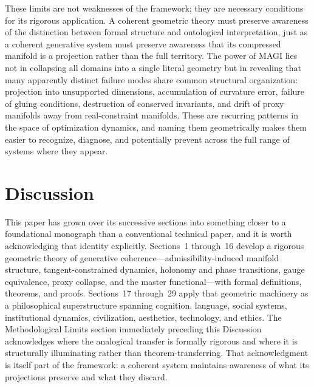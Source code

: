 \documentclass[11pt,a4paper,twocolumn]{article}
\begin{document}
These limits are not weaknesses of the framework; they are
necessary conditions for its rigorous application. A coherent
geometric theory must preserve awareness of the distinction between
formal structure and ontological interpretation, just as a
coherent generative system must preserve awareness that its
compressed manifold is a projection rather than the full territory.
The power of MAGI lies not in collapsing all domains into a single
literal geometry but in revealing that many apparently distinct
failure modes share common structural organization: projection into
unsupported dimensions, accumulation of curvature error, failure of
gluing conditions, destruction of conserved invariants, and
drift of proxy manifolds away from real-constraint manifolds. These
are recurring patterns in the space of optimization dynamics, and
naming them geometrically makes them easier to recognize, diagnose,
and potentially prevent across the full range of systems where they
appear.


\section{Discussion}

This paper has grown over its successive sections into something
closer to a foundational monograph than a conventional technical
paper, and it is worth acknowledging that identity explicitly.
Sections~1 through~16 develop a rigorous geometric theory of
generative coherence---admissibility-induced manifold structure,
tangent-constrained dynamics, holonomy and phase transitions,
gauge equivalence, proxy collapse, and the master functional---with
formal definitions, theorems, and proofs. Sections~17 through~29
apply that geometric machinery as a philosophical superstructure
spanning cognition, language, social systems, institutional dynamics,
civilization, aesthetics, technology, and ethics. The Methodological
Limits section immediately preceding this Discussion acknowledges
where the analogical transfer is formally rigorous and where it is
structurally illuminating rather than theorem-transferring. That
acknowledgment is itself part of the framework: a coherent system
maintains awareness of what its projections preserve and what they
discard.
\end{document}
